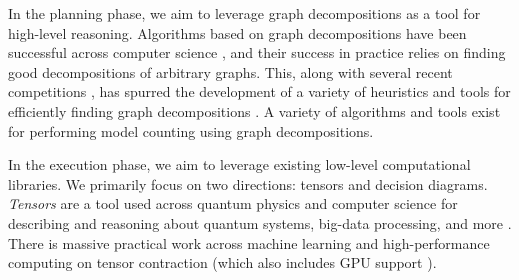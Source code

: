 In the planning phase, we aim to leverage graph decompositions as a tool for high-level reasoning.
Algorithms based on graph decompositions have been successful across computer science \cite{GLST17,MPPV04}, and their success in practice relies on finding good decompositions of arbitrary graphs. 
This, along with several recent competitions \cite{DKTW18}, has spurred the development of a variety of heuristics and tools for efficiently finding graph decompositions \cite{AMW17,HS18,Tamaki17,hicks02}. 
A variety of algorithms \cite{FMR08,SS10} and tools \cite{CW16,FHMW17,FHWZ18,FHZ19} exist for performing model counting using graph decompositions.

In the execution phase, we aim to leverage existing low-level computational libraries. 
We primarily focus on two directions: tensors and decision diagrams. 
\emph{Tensors} are a tool used across quantum physics and computer science for describing and reasoning about quantum systems, big-data processing, and more \cite{BB17,Cichocki14,Orus19}. 
There is massive practical work across machine learning and high-performance computing on tensor contraction \cite{BK07,Hirata03,KKCLA17,VZTGDMVAC18} (which also includes GPU support \cite{KSTKPPRS19,NRBHHJN15}).




